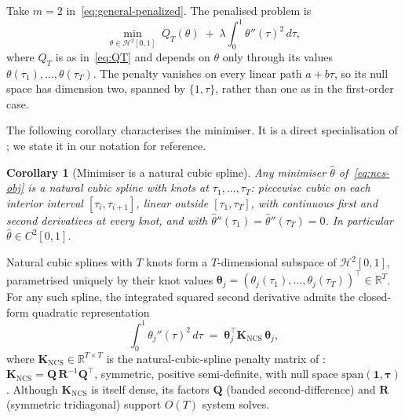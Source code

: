 \documentclass[12pt]{article}
\newcommand{\R}{\mathbb{R}}
\newcommand{\calH}{\mathcal{H}}
\newcommand{\btheta}{\boldsymbol{\theta}}
\newcommand{\btau}{\boldsymbol{\tau}}
\newcommand{\bK}{\mathbf{K}}
\newcommand{\bQ}{\mathbf{Q}}
\newcommand{\bR}{\mathbf{R}}
\newtheorem{corollary}[theorem]{Corollary}
\begin{document}
Take $m = 2$ in~\eqref{eq:general-penalized}. The penalised problem is
\begin{equation}\label{eq:ncs-obj}
  \min_{\theta \in \calH^2[0,1]} \; Q_T(\theta) \;+\; \lambda \int_0^1 \theta''(\tau)^2 \, d\tau,
\end{equation}
where $Q_T$ is as in~\eqref{eq:QT} and depends on $\theta$ only through its values $\theta(\tau_1), \ldots, \theta(\tau_T)$. The penalty vanishes on every linear path $a + b\tau$, so its null space has dimension two, spanned by $\{1, \tau\}$, rather than one as in the first-order case.

The following corollary characterises the minimiser. It is a direct specialisation of \citet[Theorem 3.1 and Example 3.1]{KimeldorfWahba1971}; we state it in our notation for reference.

\begin{corollary}[Minimiser is a natural cubic spline]\label{cor:ncs-representer}
Any minimiser $\hat\theta$ of~\eqref{eq:ncs-obj} is a natural cubic spline with knots at $\tau_1, \ldots, \tau_T$: piecewise cubic on each interior interval $[\tau_i, \tau_{i+1}]$, linear outside $[\tau_1, \tau_T]$, with continuous first and second derivatives at every knot, and with $\hat\theta''(\tau_1) = \hat\theta''(\tau_T) = 0$. In particular $\hat\theta \in C^2[0,1]$.
\end{corollary}

Natural cubic splines with $T$ knots form a $T$-dimensional subspace of $\calH^2[0,1]$, parametrised uniquely by their knot values $\btheta_j = (\theta_j(\tau_1),\ldots,\theta_j(\tau_T))^\top \in \R^T$. For any such spline, the integrated squared second derivative admits the closed-form quadratic representation
\[
  \int_0^1 \theta_j''(\tau)^2 \, d\tau \;=\; \btheta_j^\top \bK_{\mathrm{NCS}}\, \btheta_j,
\]
where $\bK_{\mathrm{NCS}} \in \R^{T\times T}$ is the natural-cubic-spline penalty matrix of \citet[\S2.1.2]{Green1994}: $\bK_{\mathrm{NCS}} = \bQ\,\bR^{-1}\bQ^\top$, symmetric, positive semi-definite, with null space $\mathrm{span}(\mathbf{1}, \btau)$. Although $\bK_{\mathrm{NCS}}$ is itself dense, its factors $\bQ$ (banded second-difference) and $\bR$ (symmetric tridiagonal) support $O(T)$ system solves.
\end{document}
